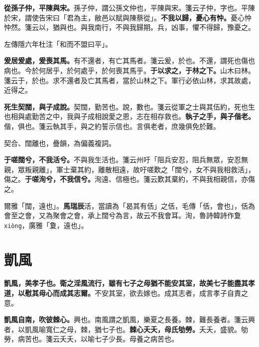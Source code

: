 \textbf{從孫子仲，平陳與宋。}{\footnotesize 孫子仲，謂公孫文仲也，平陳與宋。箋云子仲，字也。平陳於宋，謂使告宋曰「君為主，敝邑以賦與陳蔡從」。}\textbf{不我以歸，憂心有忡。}{\footnotesize 憂心忡忡然。箋云以，猶與也。與我南行，不與我歸期。兵，凶事，懼不得歸，豫憂之。}

\begin{quoting}左傳隱六年杜注「和而不盟曰平」。\end{quoting}

\textbf{爰居爰處，爰喪其馬。}{\footnotesize 有不還者，有亡其馬者。箋云爰，於也。不還，謂死也傷也病也。今於何居乎，於何處乎，於何喪其馬乎。}\textbf{于以求之，于林之下。}{\footnotesize 山木曰林。箋云于，於也。求不還者及亡其馬者，當於山林之下。軍行必依山林，求其故處，近得之。}

\textbf{死生契闊，與子成說。}{\footnotesize 契闊，勤苦也。說，數也。箋云從軍之士與其伍約，死也生也相與處勤苦之中，我與子成相說愛之恩，志在相存救也。}\textbf{執子之手，與子偕老。}{\footnotesize 偕，俱也。箋云執其手，與之約誓示信也。言俱老者，庶幾俱免於難。}

\begin{quoting}契合、闊離也，疊韻，為偏義複詞。\end{quoting}

\textbf{于嗟闊兮，不我活兮。}{\footnotesize 不與我生活也。箋云州吁「阻兵安忍，阻兵無眾，安忍無親，眾叛親離」，軍士棄其約，離散相遠，故吁嗟歎之「闊兮，女不與我相救活」，傷之。}\textbf{于嗟洵兮，不我信兮。}{\footnotesize 洵遠、信極也。箋云歎其棄約，不與我相親信，亦傷之。}

\begin{quoting}爾雅「闊，遠也」。\textbf{馬瑞辰}活，當讀為「曷其有佸」之佸，毛傳「佸，會也」，佸為會至之會，又為聚會之會，承上闊兮為言，故云不我會耳。洵，魯詩韓詩作夐 \texttt{xiòng}，廣雅「夐，遠也」。\end{quoting}

\section{凱風}


\textbf{凱風，美孝子也。衛之淫風流行，雖有七子之母猶不能安其室，故美七子能盡其孝道，以慰其母心而成其志爾。}{\footnotesize 不安其室，欲去嫁也。成其志者，成言孝子自責之意。}

\textbf{凱風自南，吹彼棘心。}{\footnotesize 興也。南風謂之凱風，樂夏之長養。棘，難長養者。箋云興者，以凱風喻寬仁之母，棘，猶七子也。}\textbf{棘心夭夭，母氏劬勞。}{\footnotesize 夭夭，盛貌。劬勞，病苦也。箋云夭夭，以喻七子少長。母養之病苦也。}


